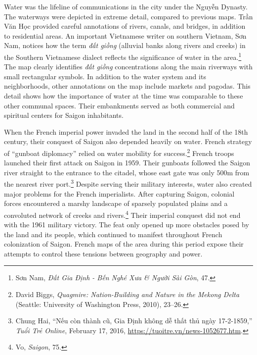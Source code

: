 Water was the lifeline of communications in the city under the Nguyễn Dynasty. The waterways were depicted in extreme detail, compared to previous maps. Trần Văn Học provided careful annotations of rivers, canals, and bridges, in addition to residential areas. An important Vietnamese writer on southern Vietnam, Sơn Nam, notices how the term \textit{đất giồng} (alluvial banks along rivers and creeks) in the Southern Vietnamese dialect reflects the significance of water in the area.\footnote{Sơn Nam, \textit{Đất Gia Định - Bến Nghé Xưa \& Người Sài Gòn}, 47.} The map clearly identifies \textit{đất giồng} concentrations along the main riverways with small rectangular symbols. In addition to the water system and its neighborhoods, other annotations on the map include markets and pagodas. This detail shows how the importance of water at the time was comparable to these other communal spaces. Their embankments served as both commercial and spiritual centers for Saigon inhabitants.

When the French imperial power invaded the land in the second half of the 18th century, their conquest of Saigon also depended heavily on water. French strategy of “gunboat diplomacy” relied on water mobility for success.\footnote{David Biggs, \textit{Quagmire: Nation-Building and Nature in the Mekong Delta} (Seattle: University of Washington Press, 2010), 23–26.} French troops launched their first attack on Saigon in 1959. Their gunboats followed the Saigon river straight to the entrance to the citadel, whose east gate was only 500m from the nearest river port.\footnote{Chung Hai, “Nếu còn thành cũ, Gia Định không dễ thất thủ ngày 17-2-1859,” \textit{Tuổi Trẻ Online}, February 17, 2016, \url{https://tuoitre.vn/news-1052677.htm}.} Despite serving their military interests, water also created major problems for the French imperialists. After capturing Saigon, colonial forces encountered a marshy landscape of sparsely populated plains and a convoluted network of creeks and rivers.\footnote{Vo, \textit{Saigon}, 75.} Their imperial conquest did not end with the 1961 military victory. The feat only opened up more obstacles posed by the land and its people, which continued to manifest throughout French colonization of Saigon. French maps of the area during this period expose their attempts to control these tensions between geography and power.


